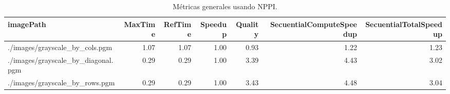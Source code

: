         \begin{table}[H]
            \centering
            \begin{adjustbox}{width=\textwidth, keepaspectratio}
                \begin{tabular}{lrrrrrr}
                    \toprule
                                             imagePath &  MaxTime &  RefTime &  Speedup &  Quality &  SecuentialComputeSpeedup &  SecuentialTotalSpeedup \\
                    \midrule
                        ./images/grayscale\_by\_cols.pgm &     1.07 &     1.07 &     1.00 &     0.93 &                      1.22 &                    1.23 \\
                    ./images/grayscale\_by\_diagonal.pgm &     0.29 &     0.29 &     1.00 &     3.39 &                      4.43 &                    3.02 \\
                        ./images/grayscale\_by\_rows.pgm &     0.29 &     0.29 &     1.00 &     3.43 &                      4.48 &                    3.04 \\
                    \bottomrule
                    \end{tabular}
                    
            \end{adjustbox}
            \caption{Métricas generales usando NPPI.}
            \label{tab:npp}
        \end{table} 
